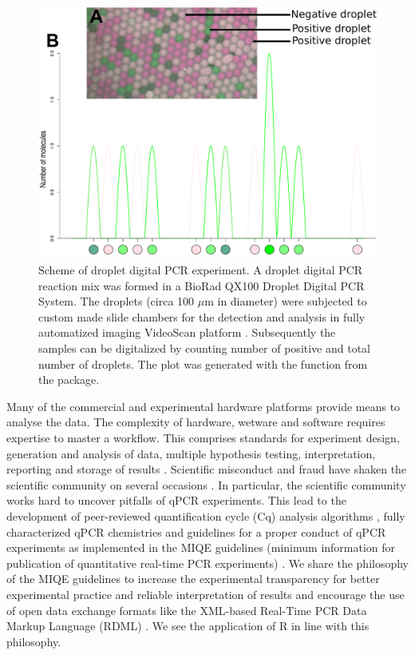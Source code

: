 \begin{figure}[htbp]
  \centering
  \includegraphics[clip=true, width=12cm]{figures/dpcR_sim.pdf} \caption{Scheme 
of droplet digital PCR experiment.  A droplet digital PCR reaction 
mix was formed in a BioRad QX100 Droplet Digital PCR System. The droplets (circa 
100 $\mu$m in diameter) were subjected to custom made slide chambers for the 
detection and analysis in fully automatized imaging VideoScan platform 
\citep{rodiger_highly_2013}.  Subsequently the samples can be 
digitalized by counting number of positive and total number of droplets. The 
plot was generated with the  function from the  
package.}
\label{figure:dpcR_sim}
\end{figure}

Many of the commercial and experimental hardware platforms provide means to 
analyse the data. The complexity of hardware, wetware and software requires 
expertise to master a workflow. This comprises standards for experiment design, 
generation and analysis of data, multiple hypothesis testing, interpretation, 
reporting and storage of results \citep{huggett_BDQ_2014, conde_2014}. 
Scientific misconduct and fraud have shaken the scientific community on several 
occasions \citep{bustin_2014}. In particular, the scientific community works 
hard to uncover pitfalls of qPCR experiments. This lead to the development of 
peer-reviewed quantification cycle (Cq) analysis algorithms 
\citep{ruijter_2013}, fully characterized qPCR chemistries 
\citep{ruijter_2014} and guidelines for a proper conduct of qPCR experiments as 
implemented in the MIQE guidelines (minimum information for publication of 
quantitative real-time PCR experiments) \citep{huggett_2013, bustin_2014}. We 
share the philosophy of the MIQE guidelines to increase the experimental 
transparency for better experimental practice and reliable interpretation of 
results and encourage the use of open data exchange formats like the XML-based 
Real-Time PCR Data Markup Language (RDML) \citep{lefever_2009}. We see the 
application of R in line with this philosophy. 

